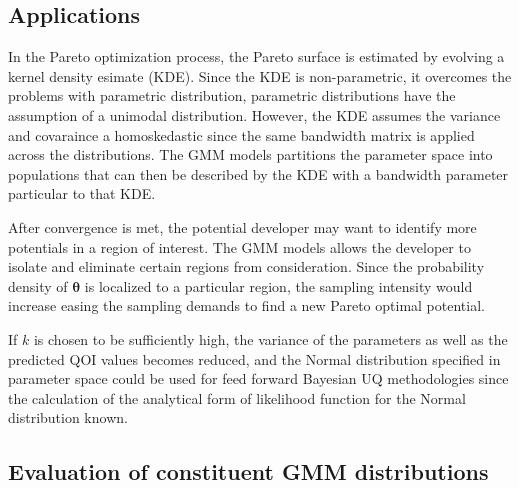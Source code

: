 \subsection{Applications}
In the Pareto optimization process, the Pareto surface is estimated by evolving a kernel density esimate (KDE).  Since the KDE is non-parametric, it overcomes the problems with parametric distribution, parametric distributions have the assumption of a unimodal distribution.  However, the KDE assumes the variance and covaraince a homoskedastic since the same bandwidth matrix is applied across the distributions.  The GMM models partitions the parameter space into populations that can then be described by the KDE with a bandwidth parameter particular to that KDE.

After convergence is met, the potential developer may want to identify more potentials in a region of interest.  The GMM models allows the developer to isolate and eliminate certain regions from consideration.  Since the probability density of $\bm{\theta}$ is localized to a particular region, the sampling intensity would increase easing the sampling demands to find a new Pareto optimal potential.

If $k$ is chosen to be sufficiently high, the variance of the parameters as well as the predicted QOI values becomes reduced, and the Normal distribution specified in parameter space could be used for feed forward Bayesian UQ methodologies since the calculation of the analytical form of likelihood function for the Normal distribution known.

\subsection{Evaluation of constituent GMM distributions}

